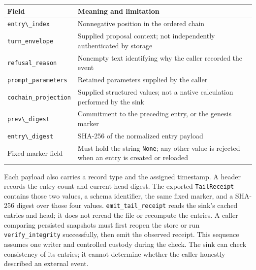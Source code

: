 \documentclass[
  11pt,
]{article}
\newcommand{\passthrough}[1]{#1}
\begin{document}
\begin{longtable}[]{@{}
  >{\raggedright\arraybackslash}p{}
  >{\raggedright\arraybackslash}p{}@{}}
\toprule\noalign{}
\begin{minipage}[b]{\linewidth}\raggedright
Field
\end{minipage} & \begin{minipage}[b]{\linewidth}\raggedright
Meaning and limitation
\end{minipage} \\
\midrule\noalign{}
\endhead
\bottomrule\noalign{}
\endlastfoot
\passthrough{\lstinline!entry\_index!} & Nonnegative position in the
ordered chain \\
\nolinkurl{turn_envelope} & Supplied proposal context; not independently
authenticated by storage \\
\nolinkurl{refusal_reason} & Nonempty text identifying why the caller
recorded the event \\
\nolinkurl{prompt_parameters} & Retained parameters supplied by the
caller \\
\nolinkurl{cochain_projection} & Supplied structured values; not a
native calculation performed by the sink \\
\passthrough{\lstinline!prev\_digest!} & Commitment to the preceding
entry, or the genesis marker \\
\passthrough{\lstinline!entry\_digest!} & SHA-256 of the normalized
entry payload \\
Fixed marker field & Must hold the string
\passthrough{\lstinline!None!}; any other value is rejected when an
entry is created or reloaded \\
\end{longtable}

Each payload also carries a record type and the assigned timestamp. A
header records the entry count and current head digest. The exported
\passthrough{\lstinline!TailReceipt!} contains those two values, a
schema identifier, the same fixed marker, and a SHA-256 digest over
those four values. \nolinkurl{emit_tail_receipt} reads the sink's cached
entries and head; it does not reread the file or recompute the entries.
A caller comparing persisted snapshots must first reopen the store or
run \nolinkurl{verify_integrity} successfully, then emit the observed
receipt. This sequence assumes one writer and controlled custody during
the check. The sink can check consistency of its entries; it cannot
determine whether the caller honestly described an external event.
\end{document}
